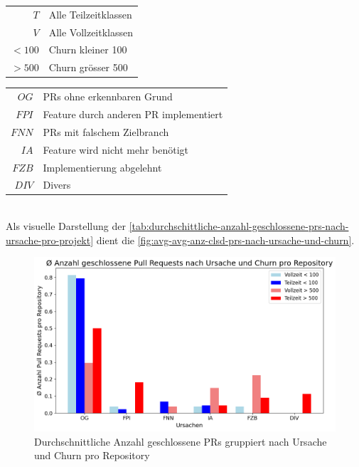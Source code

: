 \noindent
\begin{minipage}[t]{0.3\textwidth}
\begin{tabular}{r l}
$T$ & Alle Teilzeitklassen \\
$V$ & Alle Vollzeitklassen \\
$< 100$ & Churn kleiner 100 \\
$> 500$ & Churn grösser 500 \\
\end{tabular}
\end{minipage}
\hfill
\begin{minipage}[t]{0.6\textwidth}
\begin{tabular}{r l}
$OG$ & PRs ohne erkennbaren Grund \\
$FPI$ & Feature durch anderen PR im\-plementiert \\
$FNN$ & PRs mit falschem Zielbranch \\
$IA$ & Feature wird nicht mehr benötigt \\
$FZB$ & Implementierung abgelehnt  \\
$DIV$ & Divers \\
\end{tabular}
\end{minipage}
\\

Als visuelle Darstellung der \autoref{tab:durchschittliche-anzahl-geschlossene-prs-nach-ursache-pro-projekt} dient die \autoref{fig:avg-avg-anz-clsd-prs-nach-ursache-und-churn}.

\begin{figure}[htbp]
    \includegraphics[width=\textwidth]{Figures/ursachenanalyse-pro-repo.png}
    \caption{Durchschnittliche Anzahl geschlossene PRs gruppiert nach Ursache und Churn pro Repository}
    \label{fig:avg-avg-anz-clsd-prs-nach-ursache-und-churn}
\end{figure}

